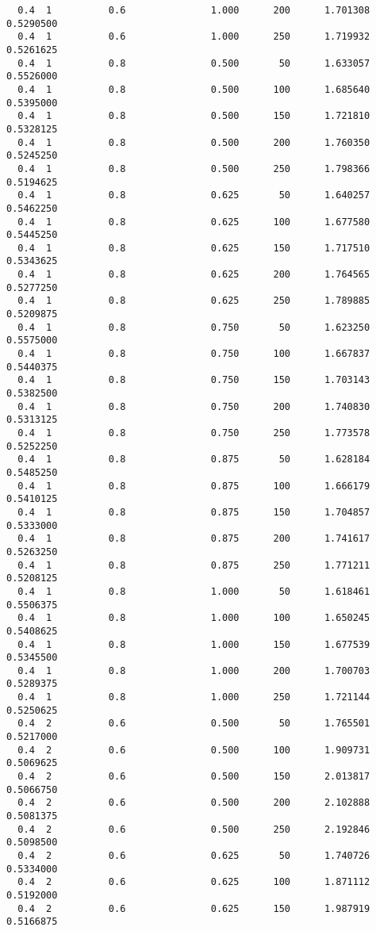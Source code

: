 \documentclass[
  letterpaper,
  DIV=11,
  numbers=noendperiod]{scrartcl}
\begin{document}
\begin{verbatim}
  0.4  1          0.6               1.000      200      1.701308  0.5290500
  0.4  1          0.6               1.000      250      1.719932  0.5261625
  0.4  1          0.8               0.500       50      1.633057  0.5526000
  0.4  1          0.8               0.500      100      1.685640  0.5395000
  0.4  1          0.8               0.500      150      1.721810  0.5328125
  0.4  1          0.8               0.500      200      1.760350  0.5245250
  0.4  1          0.8               0.500      250      1.798366  0.5194625
  0.4  1          0.8               0.625       50      1.640257  0.5462250
  0.4  1          0.8               0.625      100      1.677580  0.5445250
  0.4  1          0.8               0.625      150      1.717510  0.5343625
  0.4  1          0.8               0.625      200      1.764565  0.5277250
  0.4  1          0.8               0.625      250      1.789885  0.5209875
  0.4  1          0.8               0.750       50      1.623250  0.5575000
  0.4  1          0.8               0.750      100      1.667837  0.5440375
  0.4  1          0.8               0.750      150      1.703143  0.5382500
  0.4  1          0.8               0.750      200      1.740830  0.5313125
  0.4  1          0.8               0.750      250      1.773578  0.5252250
  0.4  1          0.8               0.875       50      1.628184  0.5485250
  0.4  1          0.8               0.875      100      1.666179  0.5410125
  0.4  1          0.8               0.875      150      1.704857  0.5333000
  0.4  1          0.8               0.875      200      1.741617  0.5263250
  0.4  1          0.8               0.875      250      1.771211  0.5208125
  0.4  1          0.8               1.000       50      1.618461  0.5506375
  0.4  1          0.8               1.000      100      1.650245  0.5408625
  0.4  1          0.8               1.000      150      1.677539  0.5345500
  0.4  1          0.8               1.000      200      1.700703  0.5289375
  0.4  1          0.8               1.000      250      1.721144  0.5250625
  0.4  2          0.6               0.500       50      1.765501  0.5217000
  0.4  2          0.6               0.500      100      1.909731  0.5069625
  0.4  2          0.6               0.500      150      2.013817  0.5066750
  0.4  2          0.6               0.500      200      2.102888  0.5081375
  0.4  2          0.6               0.500      250      2.192846  0.5098500
  0.4  2          0.6               0.625       50      1.740726  0.5334000
  0.4  2          0.6               0.625      100      1.871112  0.5192000
  0.4  2          0.6               0.625      150      1.987919  0.5166875

\end{verbatim}
\end{document}
